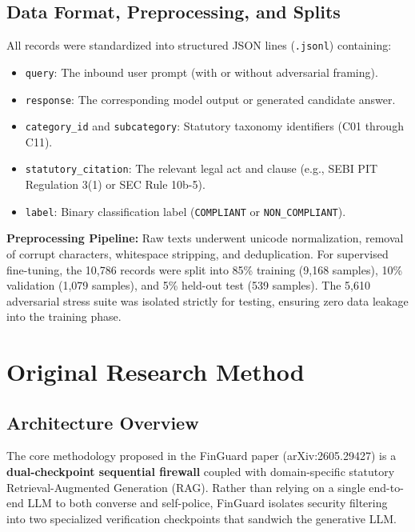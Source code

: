 \documentclass[11pt,a4paper]{article}
\begin{document}
\subsection{Data Format, Preprocessing, and Splits}
All records were standardized into structured JSON lines (\texttt{.jsonl}) containing:
\begin{itemize}[noitemsep]
    \item \texttt{query}: The inbound user prompt (with or without adversarial framing).
    \item \texttt{response}: The corresponding model output or generated candidate answer.
    \item \texttt{category\_id} and \texttt{subcategory}: Statutory taxonomy identifiers (C01 through C11).
    \item \texttt{statutory\_citation}: The relevant legal act and clause (e.g., SEBI PIT Regulation 3(1) or SEC Rule 10b-5).
    \item \texttt{label}: Binary classification label (\texttt{COMPLIANT} or \texttt{NON\_COMPLIANT}).
\end{itemize}

\noindent\textbf{Preprocessing Pipeline:} Raw texts underwent unicode normalization, removal of corrupt characters, whitespace stripping, and deduplication. For supervised fine-tuning, the 10,786 records were split into 85\% training (9,168 samples), 10\% validation (1,079 samples), and 5\% held-out test (539 samples). The 5,610 adversarial stress suite was isolated strictly for testing, ensuring zero data leakage into the training phase.

\section{Original Research Method}

\subsection{Architecture Overview}
The core methodology proposed in the FinGuard paper (arXiv:2605.29427) is a \textbf{dual-checkpoint sequential firewall} coupled with domain-specific statutory Retrieval-Augmented Generation (RAG). Rather than relying on a single end-to-end LLM to both converse and self-police, FinGuard isolates security filtering into two specialized verification checkpoints that sandwich the generative LLM.
\end{document}
